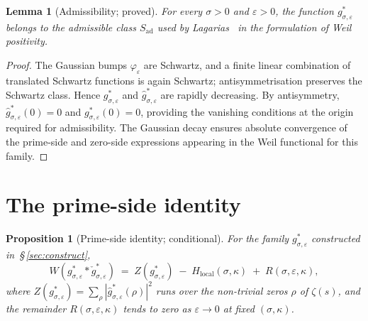 \documentclass[11pt]{article}
\newtheorem{proposition}[theorem]{Proposition}
\newtheorem{lemma}[theorem]{Lemma}
\newcommand{\Hlocal}{H_{\mathrm{local}}}
\newcommand{\Sad}{S_{\mathrm{ad}}}
\begin{document}
\begin{lemma}[Admissibility; proved]\label{lem:admissible}
For every $\sigma>0$ and $\varepsilon>0$, the function
$g^*_{\sigma,\varepsilon}$ belongs to the admissible class $\Sad$
used by Lagarias~\cite{Lagarias} in the formulation of Weil
positivity.
\end{lemma}

\begin{proof}
The Gaussian bumps $\varphi_\varepsilon$ are Schwartz, and a
finite linear combination of translated Schwartz functions is
again Schwartz; antisymmetrisation preserves the Schwartz class.
Hence $g^*_{\sigma,\varepsilon}$ and
$\widehat g^*_{\sigma,\varepsilon}$ are rapidly decreasing.
By antisymmetry, $\widehat g^*_{\sigma,\varepsilon}(0)=0$ and
$g^*_{\sigma,\varepsilon}(0)=0$, providing the vanishing
conditions at the origin required for admissibility.
The Gaussian decay ensures absolute convergence of the
prime-side and zero-side expressions appearing in the Weil
functional for this family.
\end{proof}

\section{The prime-side identity}
\label{sec:prime-side}

\begin{proposition}[Prime-side identity; conditional]\label{prop:prime-side}
For the family $g^*_{\sigma,\varepsilon}$ constructed
in~\S\,\ref{sec:construct},
\begin{equation}\label{eq:weil-decomp}
W(g^*_{\sigma,\varepsilon}*\check g^*_{\sigma,\varepsilon})
\;=\; Z(g^*_{\sigma,\varepsilon})\;-\;\Hlocal(\sigma,\kappa)
\;+\; R(\sigma,\varepsilon,\kappa),
\end{equation}
where $Z(g^*_{\sigma,\varepsilon})=\sum_\rho
|\widehat g^*_{\sigma,\varepsilon}(\rho)|^2$ runs over the
non-trivial zeros $\rho$ of $\zeta(s)$, and the remainder
$R(\sigma,\varepsilon,\kappa)$ tends to zero as $\varepsilon\to 0$
at fixed $(\sigma,\kappa)$.
\end{proposition}
\end{document}
